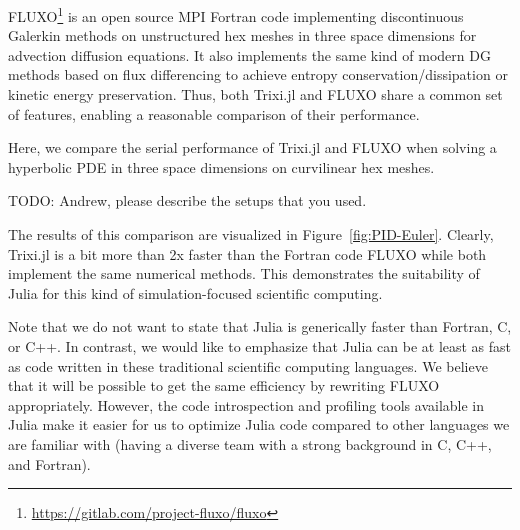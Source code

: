 \documentclass{juliacon}
\begin{document}
FLUXO\footnote{\url{https://gitlab.com/project-fluxo/fluxo}} is an open source
MPI Fortran code implementing discontinuous Galerkin methods on unstructured hex
meshes in three space dimensions for advection diffusion equations. It also
implements the same kind of modern DG methods based on flux differencing
to achieve entropy conservation/dissipation or kinetic energy preservation.
Thus, both Trixi.jl and FLUXO share a common set of features, enabling a reasonable
comparison of their performance.

Here, we compare the serial performance of Trixi.jl and FLUXO when solving a
hyperbolic PDE in three space dimensions on curvilinear hex meshes.

TODO: Andrew, please describe the setups that you used. %

The results of this comparison are visualized in Figure~\ref{fig:PID-Euler}.
Clearly, Trixi.jl is a bit more than 2x faster than the Fortran code FLUXO
while both implement the same numerical methods. This demonstrates the
suitability of Julia for this kind of simulation-focused scientific computing.

Note that we do not want to state that Julia is generically faster than Fortran,
C, or C++. In contrast, we would like to emphasize that Julia can be at least
as fast as code written in these traditional scientific computing languages.
We believe that it will be possible to get the same efficiency by rewriting
FLUXO appropriately. However, the code introspection and profiling tools available
in Julia make it easier for us to optimize Julia code compared to other languages
we are familiar with (having a diverse team with a strong background in C, C++,
and Fortran).
\end{document}
